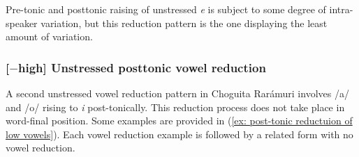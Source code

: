     \z
\z

Pre-tonic and posttonic raising of unstressed \textit{e} is subject to some degree of intra-speaker variation, but this reduction pattern is the one displaying the least amount of variation.

\subsubsection{[$-$high] Unstressed posttonic vowel reduction}

A second unstressed vowel reduction pattern in Choguita Rarámuri involves /a/ and /o/ rising to \textit{i} post-tonically. This reduction process does not take place in word-final position. Some examples are provided in (\ref{ex: post-tonic reductuion of low vowels}). Each vowel reduction example is followed by a related form with no vowel reduction.

